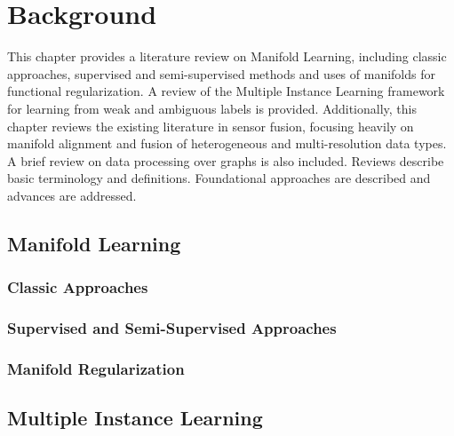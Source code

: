 \chapter{Background}

This chapter provides a literature review on Manifold Learning, including classic approaches, supervised and semi-supervised methods and uses of manifolds for functional regularization.  A review of the Multiple Instance Learning framework for learning from weak and ambiguous labels is provided. Additionally, this chapter reviews the existing literature in sensor fusion, focusing heavily on manifold alignment and fusion of heterogeneous and multi-resolution data types.  A brief review on data processing over graphs is also included.  Reviews describe basic terminology and definitions.  Foundational approaches are described and advances are addressed.

\section{Manifold Learning}

\subsection{Classic Approaches}

%

\subsection{Supervised and Semi-Supervised Approaches}

\subsection{Manifold Regularization}


\section{Multiple Instance Learning}

